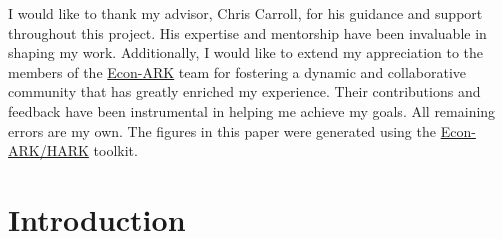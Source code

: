 \documentclass{article}
\begin{document}
% 
% 

I would like to thank my advisor, Chris Carroll, for his guidance and support throughout this project. His expertise and mentorship have been invaluable in shaping my work. Additionally, I would like to extend my appreciation to the members of the \href{https://econ-ark.org/}{Econ-ARK} team for fostering a dynamic and collaborative community that has greatly enriched my experience. Their contributions and feedback have been instrumental in helping me achieve my goals. All remaining errors are my own. The figures in this paper were generated using the \href{https://github.com/econ-ark/HARK}{Econ-ARK/HARK} toolkit.

\section{Introduction}\label{Introduction}
\end{document}
